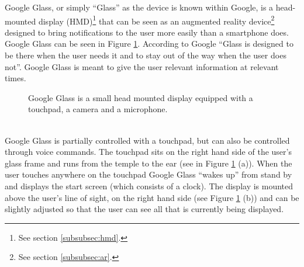 Google Glass, or simply ``Glass'' as the device is known within Google, is a head-mounted display (HMD)\footnote{See section \ref{subsubsec:hmd}.} that can be seen as an augmented reality device\footnote{See section \ref{subsubsec:ar}.} designed to bring notifications to the user more easily than a smartphone does. Google Glass can be seen in Figure \ref{GoogleGlassHardware}. According to Google ``Glass is designed to be there when the user needs it and to stay out of the way when the user does not''.\cite{glassDesignPrinciples} Google Glass is meant to give the user relevant information at relevant times.
\\
	\begin{figure}[ht!]
		\centering
    \qquad
    \qquad
		\caption{Google Glass is a small head mounted display equipped with a touchpad, a camera and a microphone.\cite{ImagesGoogleGlassUI}}
		\label{GoogleGlassHardware}
	\end{figure}
\\
Google Glass is partially controlled with a touchpad, but can also be controlled through voice commands. The touchpad sits on the right hand side of the user's glass frame and runs from the temple to the ear (see in Figure \ref{GoogleGlassHardware} (a)). When the user touches anywhere on the touchpad Google Glass ``wakes up'' from stand by and displays the start screen (which consists of a clock). The display is mounted above the user's line of sight, on the right hand side (see Figure \ref{GoogleGlassHardware} (b)) and can be slightly adjusted so that the user can see all that is currently being displayed.
